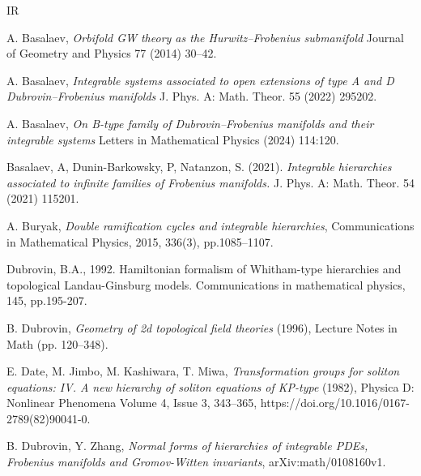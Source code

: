 \documentclass[12pt,a4paper]{amsart}
\newcommand{\<}{\left<}
\renewcommand{\>}{\right>}
\numberwithin{equation}{section}
\begin{document}
\begin{thebibliography}{IR}

A. Basalaev,
{\it Orbifold GW theory as the Hurwitz–Frobenius submanifold}
Journal of Geometry and Physics 77 (2014) 30–42.

A. Basalaev,
{\it Integrable systems associated to open extensions of type A and D Dubrovin--Frobenius manifolds}
J. Phys. A: Math. Theor. 55 (2022) 295202.

A. Basalaev,
{\it On B-type family of Dubrovin–Frobenius manifolds and their integrable systems}
Letters in Mathematical Physics (2024) 114:120.

Basalaev, A, Dunin-Barkowsky, P, Natanzon, S. (2021).
{\it Integrable hierarchies associated to infinite families of Frobenius manifolds.}
J. Phys. A: Math. Theor. 54 (2021) 115201.

A. Buryak, \textit{Double ramification cycles and integrable hierarchies}, Communications in Mathematical Physics, 2015, 336(3), pp.1085--1107.

Dubrovin, B.A., 1992. Hamiltonian formalism of Whitham-type hierarchies and topological Landau-Ginsburg models. Communications in mathematical physics, 145, pp.195-207.

B. Dubrovin, \textit{Geometry of 2d topological field theories} (1996), Lecture Notes in Math (pp. 120–348).



E. Date, M. Jimbo, M. Kashiwara, T. Miwa, \textit{Transformation groups for soliton equations: IV. A new hierarchy of soliton equations of KP-type} (1982), Physica D: Nonlinear Phenomena
Volume 4, Issue 3, 343--365, https://doi.org/10.1016/0167-2789(82)90041-0.

B. Dubrovin, Y. Zhang, \textit{Normal forms of hierarchies of integrable PDEs, Frobenius manifolds and Gromov-Witten invariants}, arXiv:math/0108160v1.


\end{thebibliography}
\end{document}
